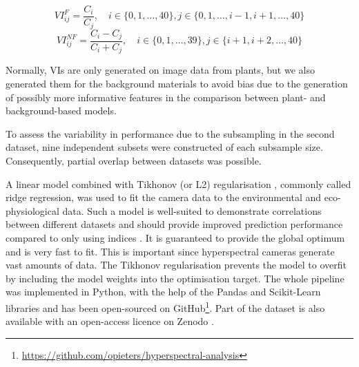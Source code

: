 \documentclass[10pt,authoryear,a4paper]{elsarticle}
\begin{document}
        
        \begin{equation}
            VI^{F}_{ij} = \dfrac{C_i}{C_j},            \quad i \in\{0,1,\ldots,40\}, j \in \{0,1,\ldots,i-1,i+1,\ldots,40\} \label{vi1}
        \end{equation}
        \begin{equation}
            VI^{NF}_{ij} = \dfrac{C_i - C_j}{C_i+C_j}, \quad i \in\{0,1,\ldots,39\}, j \in \{i+1, i+2, \ldots,40\} \label{vi2}
        \end{equation}
        
        Normally, VIs are only generated on image data from plants, but we also generated them for the background materials to avoid bias due to the generation of possibly more informative features in the comparison between plant- and background-based models.
        
        To assess the variability in performance due to the subsampling in the second dataset, nine independent subsets were constructed of each subsample size. Consequently, partial overlap between datasets was possible.
        
        A linear model combined with Tikhonov (or L2) regularisation \citep{tikhonovSolution1963}, commonly called ridge regression, was used to fit the camera data to the environmental and eco-physiological data. Such a model is well-suited to demonstrate correlations between different datasets and should provide improved prediction performance compared to only using indices \citep{yendrekHighThroughput2017}. It is guaranteed to provide the global optimum and is very fast to fit. This is important since hyperspectral cameras generate vast amounts of data. The Tikhonov regularisation prevents the model to overfit by including the model weights into the optimisation target. 
        The whole pipeline was implemented in Python, with the help of the Pandas \citep{mckinneyData2010,mckinneyPandas2011} and Scikit-Learn \citep{pedregosaScikitlearn2011} libraries and has been open-sourced on GitHub\footnote{\url{https://github.com/opieters/hyperspectral-analysis}}. Part of the dataset is also available with an open-access licence on Zenodo \citep{pieters2020}.
        
\end{document}

